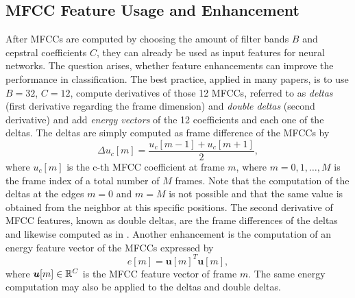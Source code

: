 
\subsection{MFCC Feature Usage and Enhancement}\label{sec:signal_mfcc_enhancement}
After MFCCs are computed by choosing the amount of filter bands $B$ and cepstral coefficients $C$, they can already be used as input features for neural networks.
The question arises, whether feature enhancements can improve the performance in classification.
The best practice, applied in many papers, is to use $B=32$, $C=12$, compute derivatives of those 12 MFCCs, referred to as \emph{deltas} (first derivative regarding the frame dimension) and \emph{double deltas} (second derivative) and add \emph{energy vectors} of the 12 coefficients and each one of the deltas.
The deltas are simply computed as frame difference of the MFCCs by
\begin{equation}\label{eq:signal_mfcc_delta}
  \Delta u_c[m] = \frac{u_c[m - 1] + u_c[m + 1]}{2},
\end{equation}
where $u_c[m]$ is the c-th MFCC coefficient at frame $m$, where $m = 0, 1, \dots, M$ is the frame index of a total number of $M$ frames.
Note that the computation of the deltas at the edges $m=0$ and $m=M$ is not possible and that the same value is obtained from the neighbor at this specific positions.
The second derivative of MFCC features, known as double deltas, are the frame differences of the deltas and likewise computed as in .
Another enhancement is the computation of an energy feature vector of the MFCCs expressed by
\begin{equation}
  e[m] = \bm{u}[m]^T \bm{u}[m],
\end{equation}
where $\bm{u}[m] \in \mathbb{R}^C$ is the MFCC feature vector of frame $m$.
The same energy computation may also be applied to the deltas and double deltas.

